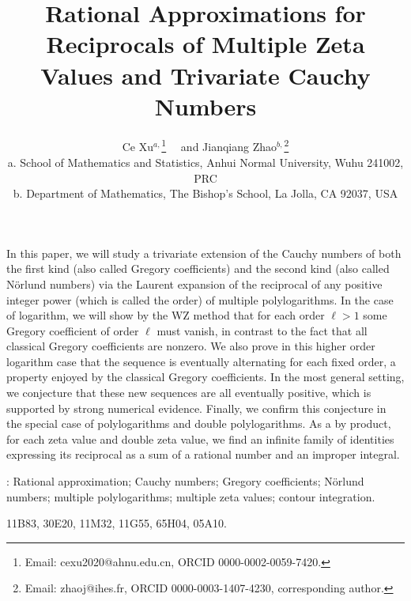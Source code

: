 \documentclass[11pt]{article}
\theoremstyle{plain}
\theoremstyle{definition}
\begin{document}
\title{\bf Rational Approximations for Reciprocals of Multiple Zeta Values and Trivariate Cauchy Numbers}
\author{
{Ce Xu${}^{a,}$\thanks{Email: cexu2020@ahnu.edu.cn, ORCID 0000-0002-0059-7420.}{} \ \ and Jianqiang Zhao${}^{b,}$\thanks{Email: zhaoj@ihes.fr, ORCID 0000-0003-1407-4230, corresponding author.}}\\[1mm]
\small a. School of Mathematics and Statistics, Anhui Normal University, Wuhu 241002, PRC\\
\small b. Department of Mathematics, The Bishop's School, La Jolla, CA 92037, USA}

\date{}
\maketitle

In this paper, we will study a trivariate extension of the Cauchy numbers of both the first kind (also called Gregory coefficients) and the second kind (also called N\"orlund numbers) via the Laurent expansion of the reciprocal of any positive integer power (which is called the order) of multiple polylogarithms. In the case of logarithm, we will show by the WZ method that for each order $\ell>1$ some Gregory coefficient of order $\ell$ must vanish, in contrast to the fact that all classical Gregory coefficients are nonzero. We also prove in this higher order logarithm case that the sequence is eventually alternating for each fixed order, a property enjoyed by the classical Gregory coefficients. In the most general setting, we conjecture that these new sequences are all eventually positive, which is supported by strong numerical evidence. Finally, we confirm this conjecture in the special case of polylogarithms and double polylogarithms. As a by product, for each zeta value and double zeta value, we find an infinite family of identities expressing its reciprocal as a sum of a rational number and an improper integral.

\medskip

: Rational approximation; Cauchy numbers; Gregory coefficients; N\"orlund numbers; multiple polylogarithms; multiple zeta values; contour integration.
\medskip

 11B83, 30E20, 11M32, 11G55, 65H04, 05A10.

\end{document}
